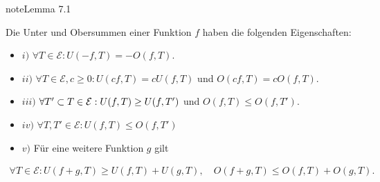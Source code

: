\documentclass[letterpaper,10pt,english]{jupyterBook}
\begin{document}
\begin{sphinxadmonition}{note}{Lemma 7.1}



Die Unter\sphinxhyphen{} und Obersummen einer Funktion \(f\) haben die folgenden Eigenschaften:
\begin{itemize}
\item {} 
\(i)\) \(\forall T \in {\mathcal E}: U(-f,T) = - O(f,T)\).

\item {} 
\(ii)\) \(\forall T \in {\mathcal E}, c \geq 0: U(cf,T) = c U(f,T)\) und \(O(cf,T) = c O(f,T).\)

\item {} 
\(iii)\) \(\forall T' \subset T \in {\cal E}: U(f,T) \geq U(f,T')\) und \(O(f,T) \leq O(f,T')\).

\item {} 
\(iv)\) \(\forall T, T' \in {\mathcal E}: U(f,T) \leq O(f,T')\)

\item {} 
\(v)\) Für eine weitere Funktion \(g\) gilt

\end{itemize}
\begin{equation*}
\begin{split}\forall T \in {\mathcal E}: U(f+g,T) \geq U(f,T) + U(g,T), \quad O(f+g,T) \leq O(f,T) + O(g,T).\end{split}
\end{equation*}\end{sphinxadmonition}
\end{document}

